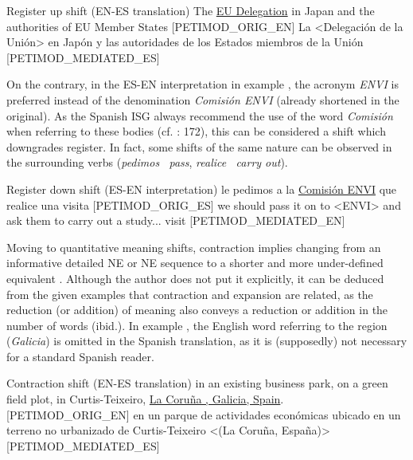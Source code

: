 \documentclass[output=paper]{langscibook}
\begin{document}
\ea\label{ex:corpas:1}
Register up shift (EN-ES translation)
\ea
The \underline{EU Delegation} in Japan and the authorities of EU Member States [PETIMOD\_ORIG\_EN]
\ex
La <Delegación de la Unión> en Japón y las autoridades de los Estados miembros de la Unión [PETIMOD\_MEDIATED\_ES]
\z
\z

On the contrary, in the ES-EN interpretation in example , the acronym \textit{ENVI} is preferred instead of the denomination \textit{Comisión ENVI} (already shortened in the original). As the Spanish ISG always recommend the use of the word \textit{Comisión} when referring to these bodies (cf. \citealt{EU2021}: 172), this can be considered a shift which downgrades register. In fact, some shifts of the same nature can be observed in the surrounding verbs (\textit{pedimos \rightarrow$\,$ pass}, \textit{realice \rightarrow$\,$ carry out}).

\ea\label{ex:corpas:2}
Register down shift (ES-EN interpretation)
\ea
le pedimos a la \underline{Comisión ENVI} que realice una visita [PETIMOD\_ORIG\_ES]
\ex
we should pass it on to <ENVI> and ask them to carry out a study... visit [PETIMOD\_MEDIATED\_EN]
\z
\z

Moving to quantitative meaning shifts, contraction implies changing from an informative detailed NE or NE sequence to a shorter and more under-defined equivalent \citep[141]{Bernardini2016}. Although the author does not put it explicitly, it can be deduced from the given examples that contraction and expansion are related, as the reduction (or addition) of meaning also conveys a reduction or addition in the number of words (ibid.). In example , the English word referring to the region (\textit{Galicia}) is omitted in the Spanish translation, as it is (supposedly) not necessary for a standard Spanish reader.

\ea\label{ex:corpas:3}
Contraction shift (EN-ES translation)
\ea
in an existing business park, on a green field plot, in Curtis-Teixeiro, \underline{La Coruña , Galicia, Spain}. [PETIMOD\_ORIG\_EN]
\ex
en un parque de actividades económicas ubicado en un terreno no urbanizado de Curtis-Teixeiro <(La Coruña, España)> [PETIMOD\_MEDIATED\_ES]
\z
\z
\end{document}
